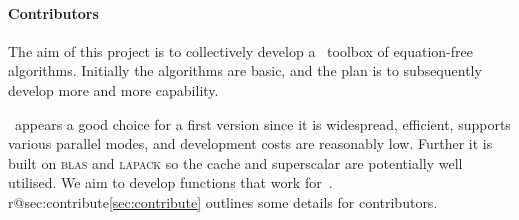 \paragraph{Contributors}
The aim of this project is to collectively develop a \script\ toolbox of equation-free algorithms.
Initially the algorithms are basic, and the plan is to subsequently develop more and more capability.

\Matlab\ appears a good choice for a first version since it is widespread, efficient, supports various parallel modes, and development costs are reasonably low.
Further it is built on \textsc{blas} and \textsc{lapack} so the cache and superscalar \cpu{} are potentially well utilised.
We aim to develop functions that work for~\script.
\ifcsname r@sec:contribute\endcsname\cref{sec:contribute} outlines some details for contributors.\fi




